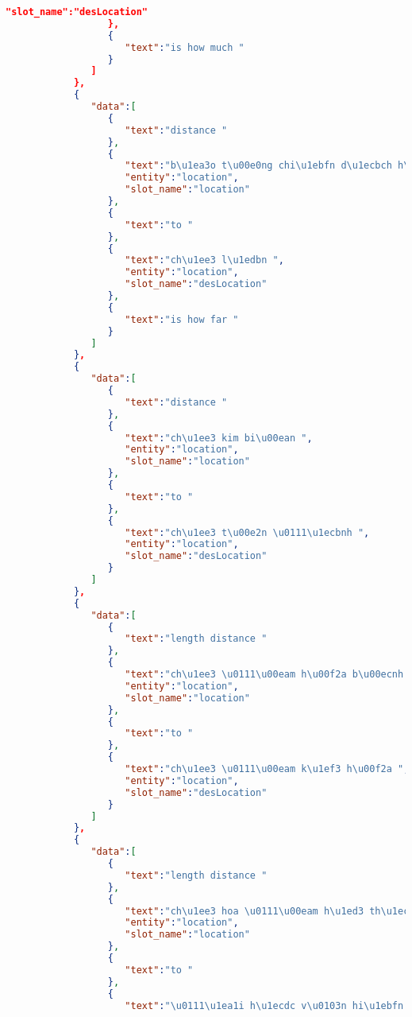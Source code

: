 \begin{lstlisting}[language=json,firstnumber=1]
                     "slot_name":"desLocation"
                  },
                  {
                     "text":"is how much "
                  }
               ]
            },
            {
               "data":[
                  {
                     "text":"distance "
                  },
                  {
                     "text":"b\u1ea3o t\u00e0ng chi\u1ebfn d\u1ecbch h\u1ed3 ch\u00ed minh ",
                     "entity":"location",
                     "slot_name":"location"
                  },
                  {
                     "text":"to "
                  },
                  {
                     "text":"ch\u1ee3 l\u1edbn ",
                     "entity":"location",
                     "slot_name":"desLocation"
                  },
                  {
                     "text":"is how far "
                  }
               ]
            },
            {
               "data":[
                  {
                     "text":"distance "
                  },
                  {
                     "text":"ch\u1ee3 kim bi\u00ean ",
                     "entity":"location",
                     "slot_name":"location"
                  },
                  {
                     "text":"to "
                  },
                  {
                     "text":"ch\u1ee3 t\u00e2n \u0111\u1ecbnh ",
                     "entity":"location",
                     "slot_name":"desLocation"
                  }
               ]
            },
            {
               "data":[
                  {
                     "text":"length distance "
                  },
                  {
                     "text":"ch\u1ee3 \u0111\u00eam h\u00f2a b\u00ecnh ",
                     "entity":"location",
                     "slot_name":"location"
                  },
                  {
                     "text":"to "
                  },
                  {
                     "text":"ch\u1ee3 \u0111\u00eam k\u1ef3 h\u00f2a ",
                     "entity":"location",
                     "slot_name":"desLocation"
                  }
               ]
            },
            {
               "data":[
                  {
                     "text":"length distance "
                  },
                  {
                     "text":"ch\u1ee3 hoa \u0111\u00eam h\u1ed3 th\u1ecb k\u1ef7 ",
                     "entity":"location",
                     "slot_name":"location"
                  },
                  {
                     "text":"to "
                  },
                  {
                     "text":"\u0111\u1ea1i h\u1ecdc v\u0103n hi\u1ebfn ",

\end{lstlisting}
